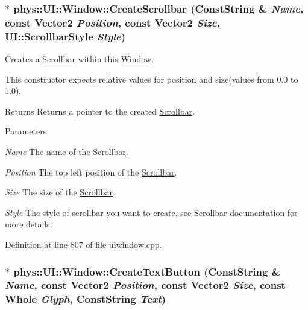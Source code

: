 \hypertarget{classphys_1_1UI_1_1Window_aaa780401181e4ed69409b8f8a6396872}{
\subsubsection[{CreateScrollbar}]{ $\ast$ phys::UI::Window::CreateScrollbar ({\bf ConstString} \& {\em Name}, \/  const {\bf Vector2} {\em Position}, \/  const {\bf Vector2} {\em Size}, \/  UI::ScrollbarStyle {\em Style})}}
\label{d4/d86/classphys_1_1UI_1_1Window_aaa780401181e4ed69409b8f8a6396872}


Creates a \hyperlink{classphys_1_1UI_1_1Scrollbar}{Scrollbar} within this \hyperlink{classphys_1_1UI_1_1Window}{Window}. 

This constructor expects relative values for position and size(values from 0.0 to 1.0). \begin{DoxyReturn}{Returns}
Returns a pointer to the created \hyperlink{classphys_1_1UI_1_1Scrollbar}{Scrollbar}. 
\end{DoxyReturn}

\begin{DoxyParams}{Parameters}
\item[{\em Name}]The name of the \hyperlink{classphys_1_1UI_1_1Scrollbar}{Scrollbar}. \item[{\em Position}]The top left position of the \hyperlink{classphys_1_1UI_1_1Scrollbar}{Scrollbar}. \item[{\em Size}]The size of the \hyperlink{classphys_1_1UI_1_1Scrollbar}{Scrollbar}. \item[{\em Style}]The style of scrollbar you want to create, see \hyperlink{classphys_1_1UI_1_1Scrollbar}{Scrollbar} documentation for more details. \end{DoxyParams}


Definition at line 807 of file uiwindow.cpp.

\hypertarget{classphys_1_1UI_1_1Window_a4852c7abd3ce842a424ae0621b70df34}{
\subsubsection[{CreateTextButton}]{ $\ast$ phys::UI::Window::CreateTextButton ({\bf ConstString} \& {\em Name}, \/  const {\bf Vector2} {\em Position}, \/  const {\bf Vector2} {\em Size}, \/  const {\bf Whole} {\em Glyph}, \/  {\bf ConstString} {\em Text})}}
\label{d4/d86/classphys_1_1UI_1_1Window_a4852c7abd3ce842a424ae0621b70df34}



